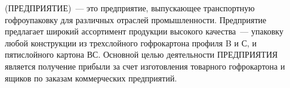 


\FIRMA (ПРЕДПРИЯТИЕ)~--- это предприятие, выпускающее транспортную гофроупаковку для различных отраслей промышленности. Предприятие предлагает широкий ассортимент продукции высокого качества~--- упаковку любой конструкции из трехслойного гофрокартона профиля B и С, и пятислойного картона ВС. Основной целью деятельности ПРЕДПРИЯТИЯ является получение прибыли за счет изготовления товарного гофрокартона и ящиков по заказам коммерческих предприятий.
